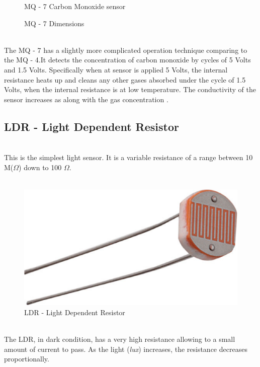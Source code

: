 \documentclass[12pt,a4paper,draft]{report}
\begin{document}
\begin{figure}[H]
\caption{MQ - 7 Carbon Monoxide  sensor}
\caption{MQ - 7 Dimensions}
\end{figure}
\ \\
The MQ - 7 has a slightly more complicated operation technique comparing to the MQ - 4.It detects the concentration of carbon monoxide by cycles of 5 Volts and 1.5 Volts. Specifically when at sensor is applied 5 Volts, the internal resistance heats up and cleans any other gases absorbed under the cycle of 1.5 Volts, when the internal resistance is at low temperature. 
The conductivity of the sensor increases as along with the gas concentration \cite{website:mq7_datasheet}.
\ \\
%
\subsection{LDR - Light Dependent Resistor}
\ \\
This is the simplest light sensor. It is a variable resistance of a range between 10 M($\Omega$) down to 100 $\Omega$.
\\ \
\begin{figure}[H]
\centering
\includegraphics*[scale=0.2]{ldr}
\caption{LDR - Light Dependent Resistor}
\end{figure}
\ \\
The LDR, in dark condition, has a very high resistance allowing to a small amount of current to pass. As the light (\textit{lux}) increases, the resistance decreases proportionally.
\ \\
%
\end{document}
